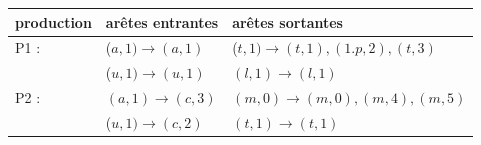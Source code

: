 \documentclass{beamer}
\begin{document}
{	\begin{table}
		\scriptsize
		\begin{tabular}{ | l | l |  l |}
			\hline production & arêtes entrantes & arêtes sortantes  \\ \hline
			P1 : & (\(a,1) {\rightarrow} (a,1)\) &  (\(t,1) {\rightarrow} (t,1),(1.p,2),(t,3)\)   \\ \hline
			& (\(u,1) {\rightarrow} (u,1)\) & \( (l,1) {\rightarrow} (l,1)\)  \\ \hline
			P2 : & \((a,1) {\rightarrow} (c,3)\) &  \((m,0) {\rightarrow} (m,0),(m,4),(m,5)\)    \\ \hline
			& (\(u,1) {\rightarrow} (c,2)\) &  \((t,1) {\rightarrow} (t,1)\)  \\ \hline
		\end{tabular}
	\end{table}

	}

\end{document}
